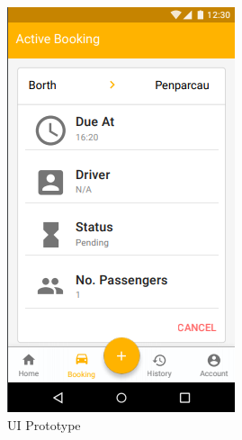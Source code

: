 \begin{figure}[!htb]
	\centering
	\begin{subfigure}[b]{0.4\linewidth}
		\includegraphics[width=\linewidth]{Resources/img/booking_overview_prototype.png}
		\caption{UI Prototype}
	\end{subfigure}
	\begin{subfigure}[b]{0.4\linewidth}

\end{subfigure}
\end{figure}
